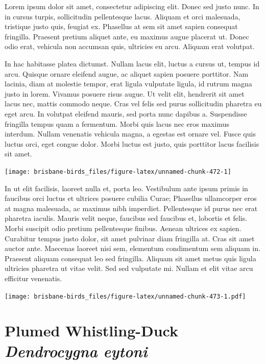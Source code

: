\documentclass[]{book}
\let\origfigure\figure
\let\endorigfigure\endfigure
\renewenvironment{figure}[1][2] {
  \expandafter\origfigure\expandafter[H]
} {
  \endorigfigure
}
\begin{document}
Lorem ipsum dolor sit amet, consectetur adipiscing elit. Donec sed justo
nunc. In in cursus turpis, sollicitudin pellentesque lacus. Aliquam et
orci malesuada, tristique justo quis, feugiat ex. Phasellus at sem sit
amet sapien consequat fringilla. Praesent pretium aliquet ante, eu
maximus augue placerat ut. Donec odio erat, vehicula non accumsan quis,
ultricies eu arcu. Aliquam erat volutpat.

In hac habitasse platea dictumst. Nullam lacus elit, luctus a cursus ut,
tempus id arcu. Quisque ornare eleifend augue, ac aliquet sapien posuere
porttitor. Nam lacinia, diam at molestie tempor, erat ligula vulputate
ligula, id rutrum magna justo in lorem. Vivamus posuere risus augue. Ut
velit elit, hendrerit sit amet lacus nec, mattis commodo neque. Cras vel
felis sed purus sollicitudin pharetra eu eget arcu. In volutpat eleifend
mauris, sed porta nunc dapibus a. Suspendisse fringilla tempus quam a
fermentum. Morbi quis lacus nec eros maximus interdum. Nullam venenatis
vehicula magna, a egestas est ornare vel. Fusce quis luctus orci, eget
congue dolor. Morbi luctus est justo, quis porttitor lacus facilisis sit
amet.

\begin{figure}
\texttt{[image: brisbane-birds\_files/figure-latex/unnamed-chunk-472-1]} \caption{insert figure caption}\label{fig:unnamed-chunk-472}
\end{figure}

In ut elit facilisis, laoreet nulla et, porta leo. Vestibulum ante ipsum
primis in faucibus orci luctus et ultrices posuere cubilia Curae;
Phasellus ullamcorper eros at magna malesuada, ac maximus nibh
imperdiet. Pellentesque id purus nec erat pharetra iaculis. Mauris velit
neque, faucibus sed faucibus et, lobortis et felis. Morbi suscipit odio
pretium pellentesque finibus. Aenean ultrices ex sapien. Curabitur
tempus justo dolor, sit amet pulvinar diam fringilla at. Cras sit amet
auctor ante. Maecenas laoreet nisi sem, elementum condimentum sem
aliquam in. Praesent aliquam consequat leo sed fringilla. Aliquam sit
amet metus quis ligula ultricies pharetra ut vitae velit. Sed sed
vulputate mi. Nullam et elit vitae arcu efficitur venenatis.

\begin{figure}
\centering
\texttt{[image: brisbane-birds\_files/figure-latex/unnamed-chunk-473-1.pdf]}
\caption{\label{fig:unnamed-chunk-473}insert figure caption}
\end{figure}

\section{\texorpdfstring{Plumed Whistling-Duck \emph{Dendrocygna
eytoni}}{Plumed Whistling-Duck Dendrocygna eytoni}}\label{plumed-whistling-duck-dendrocygna-eytoni}
\end{document}
